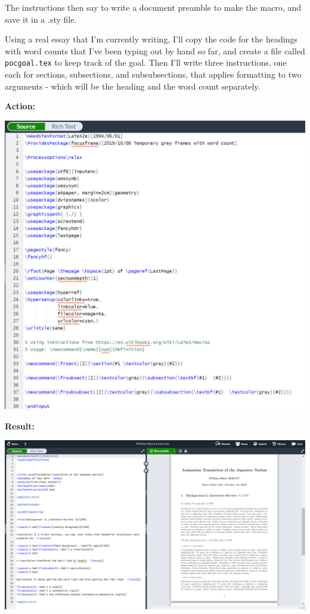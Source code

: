 \documentclass[12pt]{article}
\begin{document}
The instructions then say to write a document preamble to make the macro, and save it in a .sty file.

Using a real essay that I'm currently writing, I'll copy the code for the headings with word counts that I've been typing out by hand so far, and create a file called \texttt{pocgoal.tex} to keep track of the goal. Then I'll write three instructions, one each for sections, subsections, and subsubsections, that applies formatting to two arguments - which will be the heading and the word count separately.

\newpage\textbf{Action:} 

\includegraphics[scale=0.5]{imgfrstyfile.png}

\textbf{Result:} 

\includegraphics[width=\textwidth]{imgfrvspace.PNG}
\end{document}
